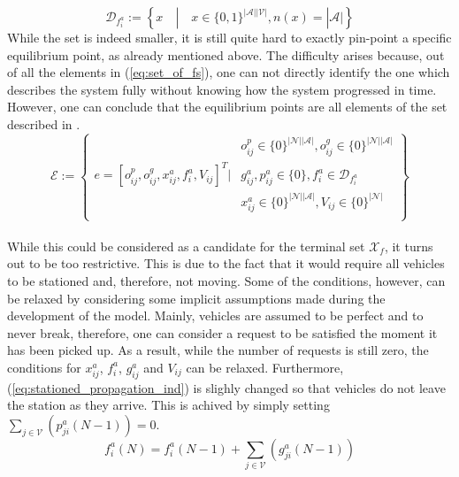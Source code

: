 \begin{equation}
\mathcal{D}_{f^a_{i}} := 	\left\{
	x   \quad | \quad x \in \{0,1\}^{|\mathcal{A}||\mathcal{V}|},  n(x) = |\mathcal{A}|
	\right\}\label{eq:set_of_fs}
\end{equation}
While the set is indeed smaller, it is still quite hard to exactly pin-point a specific equilibrium point, as already mentioned above. The difficulty arises because, out of all the elements in (\ref{eq:set_of_fs}), one can not directly identify the one which describes the system fully without knowing how the system progressed in time. However, one can conclude that the equilibrium points are all elements of the set described in . 
\begin{equation}
	\mathcal{E} := \left\{
	\begin{aligned}
		& o^p_{ij} \in \{0\}^{|\mathcal{N}||\mathcal{A}|} , o^g_{ij} \in \{0\}^{|\mathcal{N}||\mathcal{A}|}  \\
		e = [o^p_{ij},o^g_{ij}, x_{ij}^a, f^a_{i}, V_{ij}]^T \Bigg| &g^a_{ij}, p^a_{ij}\in \{0\}, f^a_{i} \in \mathcal{D}_{f^a_{i}}   \\
		&  x_{ij}^a\in\{0\}^{|\mathcal{N}||\mathcal{A}|}, V_{ij} \in \{0\}^{|\mathcal{N}|} \\%
	\end{aligned}
	\right\}\label{eq:final_eq}
\end{equation}\\
While this could be considered as a candidate for the terminal set $\mathcal{X}_f$, it turns out to be too restrictive. This is due to the fact that it would require all vehicles to be stationed and, therefore, not moving. Some of the conditions, however, can be relaxed by considering some implicit assumptions made during the development of the model. Mainly, vehicles are assumed to be perfect and to never break, therefore, one can consider a request to be satisfied the moment it has been picked up. As a result, while the number of requests is still zero, the conditions for $x_{ij}^a$, $f_{i}^a$, $g^a_{ij}$ and $V_{ij}$ can be relaxed. Furthermore, (\ref{eq:stationed_propagation_ind}) is slighly changed so that vehicles do not leave the station as they arrive. This is achived by simply setting  $\sum_{j\in\mathcal{V}}(p^a_{ji}(N-1))=0$.
\begin{equation}
	f^a_i(N) =f^a_i(N-1) + \sum_{j\in\mathcal{V}}(g^a_{ji}(N-1)) 
	\label{eq:stationed_propagation_ind2}
\end{equation}



